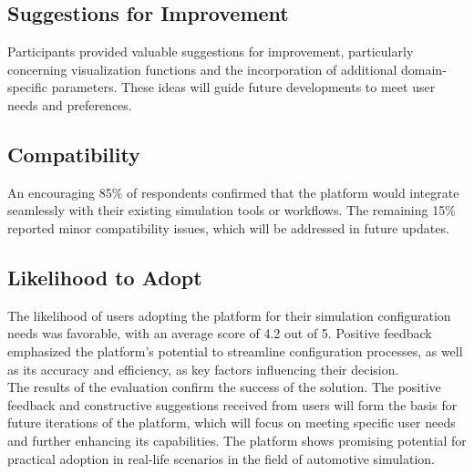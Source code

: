 \subsection{Suggestions for Improvement}
Participants provided valuable suggestions for improvement, particularly concerning visualization functions and the incorporation of additional domain-specific parameters. These ideas will guide future developments to meet user needs and preferences.\\


\subsection{Compatibility}
An encouraging 85\% of respondents confirmed that the platform would integrate seamlessly with their existing simulation tools or workflows. The remaining 15\% reported minor compatibility issues, which will be addressed in future updates.\\


\subsection{Likelihood to Adopt}
The likelihood of users adopting the platform for their simulation configuration needs was favorable, with an average score of 4.2 out of 5. Positive feedback emphasized the platform's potential to streamline configuration processes, as well as its accuracy and efficiency, as key factors influencing their decision.\\


The results of the evaluation confirm the success of the solution. The positive feedback and constructive suggestions received from users will form the basis for future iterations of the platform, which will focus on meeting specific user needs and further enhancing its capabilities. The platform shows promising potential for practical adoption in real-life scenarios in the field of automotive simulation.


